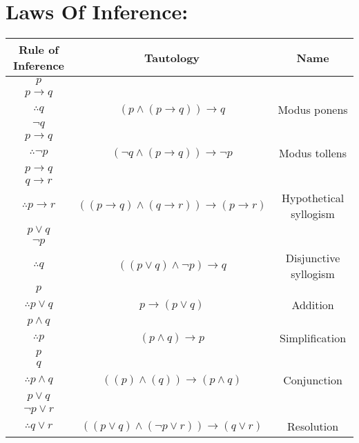 \documentclass{exam}
\begin{document}
\section{Laws Of Inference: }
\vspace{5mm}
\begin{center}
\begin{tabular}{|c|c|c|}
\hline
Rule of Inference & Tautology & Name \\
\hline
$p$ & & \\
$p \rightarrow q$ & & \\
\hline
$ \therefore q$ & $\left(p \land (p \rightarrow q)\right) \rightarrow q$ & Modus ponens \\

\hline
$\neg q$ & &\\
$p \rightarrow q$ & &\\
\hline
$\therefore \neg p$ & $\left(\neg q \land (p \rightarrow q)\right) \rightarrow \neg p$ & Modus tollens \\
\hline

$p \rightarrow q$ & &\\
$q \rightarrow r$ & & \\
\hline
$\therefore p \rightarrow r$ & $\left((p \rightarrow q) \land (q \rightarrow r)\right) \rightarrow (p \rightarrow r)$ & Hypothetical syllogism \\
\hline

$p \lor q$ & & \\
$\neg p$ & & \\
\hline
$\therefore q$ & $\left((p \lor q) \land \neg p\right) \rightarrow q$ 
& Disjunctive syllogism \\

\hline
$p$ & & \\
\hline
$\therefore p \lor q$
& $p \rightarrow (p \lor q)$ & Addition \\
\hline
$p \land q$ & &\\
\hline
$\therefore p$ & $(p \land q) \rightarrow p$ & Simplification \\
\hline
$p$ & &\\
$q$ & &\\
\hline
$\therefore p \land q$ & $ ((p) \land (q)) \rightarrow ( p \land q)$
& Conjunction \\
\hline
$p \lor q$ & & \\
$\neg p \lor r$ & & \\
\hline
$\therefore q \lor r$ & $
((p \lor q) \land (\neg p \lor r)) \rightarrow (q \lor r) $  &Resolution \\
\hline

\end{tabular}
\end{center}
\vspace{5mm}
\end{document}
